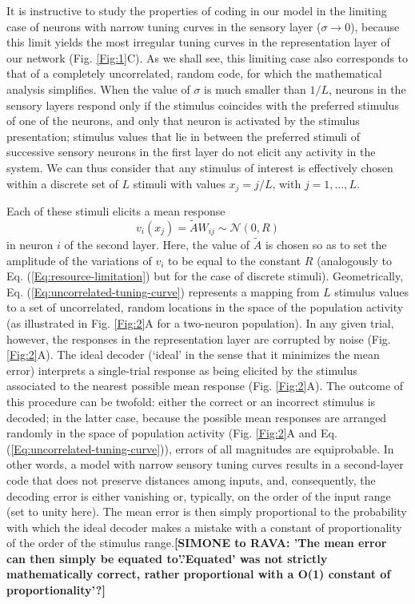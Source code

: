 \documentclass[a4paper]{article}%
\begin{document}
It is instructive to study the properties of coding in our model in the
limiting case of neurons with narrow tuning curves in the sensory layer
($\sigma\rightarrow0$), because this limit yields the most irregular tuning
curves in the representation layer of our network (Fig. \ref{Fig:1}C). As we
shall see, this limiting case also corresponds to that of a completely
uncorrelated, random code, for which the mathematical analysis simplifies.
When the value of $\sigma$ is much smaller than $1/L$, neurons in the sensory
layers respond only if the stimulus coincides with the preferred stimulus of
one of the neurons, and only that neuron is activated by the stimulus
presentation; stimulus values that lie in between the preferred stimuli of
successive sensory neurons in the first layer do not elicit any activity in
the system. We can thus consider that any stimulus of interest is effectively
chosen within a discrete set of $L$ stimuli with values $x_{j}=j/L$, with
$j=1,\ldots,L$.

Each of these stimuli elicits a mean response
\begin{equation}
v_{i}(x_{j})=\tilde{A}W_{ij}\sim\mathcal{N}(0,R)
\label{Eq:uncorrelated-tuning-curve}%
\end{equation}
in neuron $i$ of the second layer. Here, the value of $\tilde{A}$ is chosen so
as to set the amplitude of the variations of $v_{i}$ to be equal to the
constant $R$ (analogously to Eq. (\ref{Eq:resource-limitation}) but for the
case of discrete stimuli). Geometrically, Eq.
(\ref{Eq:uncorrelated-tuning-curve}) represents a mapping from $L$ stimulus
values to a set of uncorrelated, random locations in the space of the
population activity (as illustrated in Fig. \ref{Fig:2}A for a two-neuron
population). In any given trial, however, the responses in the representation
layer are corrupted by noise (Fig. \ref{Fig:2}A). The ideal decoder (`ideal'
in the sense that it minimizes the mean error) interprets a single-trial
response as being elicited by the stimulus associated to the nearest possible
mean response (Fig. \ref{Fig:2}A). The outcome of this procedure can be
twofold: either the correct or an incorrect stimulus is decoded; in the latter
case, because the possible mean responses are arranged randomly in the space
of population activity (Fig. \ref{Fig:2}A and Eq.
(\ref{Eq:uncorrelated-tuning-curve})), errors of all magnitudes are
equiprobable. In other words, a model with narrow sensory tuning curves
results in a second-layer code that does not preserve distances among inputs,
and, consequently, the decoding error is either vanishing or, typically, on
the order of the input range (set to unity here). The mean error is  then
simply proportional to the probability with which the ideal decoder makes a mistake with a constant of proportionality of the order of the stimulus range.\textbf{[SIMONE to RAVA: 'The mean error can  then
simply be equated to'.'Equated' was not strictly mathematically correct, rather proportional with a O(1) constant of proportionality'?]}
\end{document}
